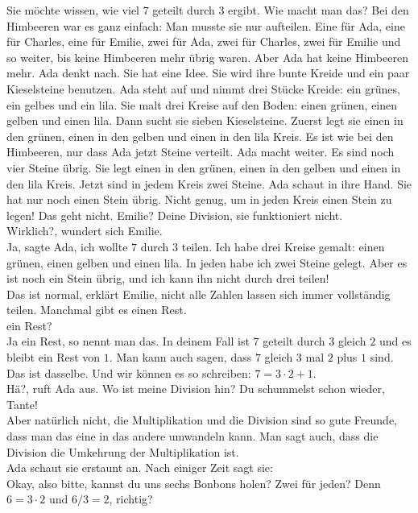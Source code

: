 Sie möchte wissen, wie viel $7$ geteilt durch $3$ ergibt. Wie macht man das? Bei den Himbeeren war es ganz einfach: Man musste sie nur aufteilen. Eine für Ada, eine für Charles, eine für Emilie, zwei für Ada, zwei für Charles, zwei für Emilie und so weiter, bis keine Himbeeren mehr übrig waren. 
Aber Ada hat keine Himbeeren mehr. 
Ada denkt nach. Sie hat eine Idee. Sie wird ihre bunte Kreide und ein paar Kieselsteine benutzen.
Ada steht auf und nimmt drei Stücke Kreide: ein grünes, ein gelbes und ein lila. Sie malt drei Kreise auf den Boden: einen grünen, einen gelben und einen lila. Dann sucht sie sieben Kieselsteine. Zuerst legt sie einen in den grünen, einen in den gelben und einen in den lila Kreis. Es ist wie bei den Himbeeren, nur dass Ada jetzt Steine verteilt. Ada macht weiter. Es sind noch vier Steine übrig. Sie legt einen in den grünen, einen in den gelben und einen in den lila Kreis. Jetzt sind in jedem Kreis zwei Steine. Ada schaut in ihre Hand. Sie hat nur noch einen Stein übrig. Nicht genug, um in jeden Kreis einen Stein zu legen! Das geht nicht.
\frqq{}Emilie? Deine Division, sie funktioniert nicht.\flqq{}\\
\frqq{}Wirklich?\flqq{}, wundert sich Emilie.\\
\frqq{}Ja\flqq{}, sagte Ada, \frqq{}ich wollte $7$ durch $3$ teilen. Ich habe drei Kreise gemalt: einen grünen, einen gelben und einen lila. In jeden habe ich zwei Steine gelegt. Aber es ist noch ein Stein übrig, und ich kann ihn nicht durch drei teilen!\flqq{}\\
\frqq{}Das ist normal\flqq{}, erklärt Emilie, \frqq{}nicht alle Zahlen lassen sich immer vollständig teilen. Manchmal gibt es einen Rest.\flqq{}\\
\frqq{}ein Rest?\flqq{}\\
\frqq{}Ja ein Rest, so nennt man das. In deinem Fall ist $7$ geteilt durch $3$ gleich $2$ und es bleibt ein Rest von $1$. Man kann auch sagen, dass $7$ gleich $3$ mal $2$ plus $1$ sind. Das ist dasselbe. Und wir können es so schreiben: $7=3\cdot2+1$.\flqq{}\\
\frqq{}Hä?\flqq{}, ruft Ada aus. \frqq{}Wo ist meine Division hin? Du schummelst schon wieder, Tante!\flqq{}\\
\frqq{}Aber natürlich nicht, die Multiplikation und die Division sind so gute Freunde, dass man das eine in das andere umwandeln kann. Man sagt auch, dass die Division die Umkehrung der Multiplikation ist.\flqq{}\\
Ada schaut sie erstaunt an. Nach einiger Zeit sagt sie:\\
\frqq{}Okay, also bitte, kannst du uns sechs Bonbons holen? Zwei für jeden? Denn $6 = 3 \cdot 2$ und $6 / 3 = 2$, richtig?\flqq{} 

